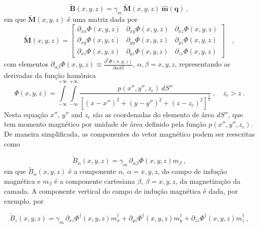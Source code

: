 \begin{equation}
\tilde{\mathbf{B}}(x, y, z) = \gamma_{m} \, \tilde{\mathbf{M}}(x, y, z) \: \hat{\mathbf{m}}(\mathbf{q}) \: ,
\label{eq:B-eqlayer}
\end{equation}
em que $\tilde{\mathbf{M}}(x, y, z)$ é uma matriz dada por 
\begin{equation}
\tilde{\mathbf{M}}(x, y, z) = \begin{bmatrix}
\partial_{xx} \Phi(x, y, z) & 
\partial_{xy} \Phi(x, y, z) &
\partial_{xz} \Phi(x, y, z) \\
\partial_{xy} \Phi(x, y, z) & 
\partial_{yy} \Phi(x, y, z) &
\partial_{yz} \Phi(x, y, z) \\
\partial_{xz} \Phi(x, y, z) & 
\partial_{yz} \Phi(x, y, z) &
\partial_{zz} \Phi(x, y, z)
\end{bmatrix} \quad ,
\label{eq:M-matriz-eqlayer-B}
\end{equation}
com elementos 
$\partial_{\alpha\beta} \Phi(x, y, z) \equiv 
\frac{\partial^{2} \Phi(x, y, z)}{\partial \alpha \partial \beta}$, 
$\alpha, \beta = x, y, z$, representando as derivadas da função hamônica 
\begin{equation}
\Phi(x, y, z) = \int\limits_{-\infty}^{+\infty}\int\limits_{-\infty}^{+\infty}
\frac{p(x'', y'', z_{c}) \: dS''}
{\left[ (x-x'')^2 + (y-y'')^2 + (z-z_{c})^2 \right]^{\frac{1}{2}}} \: ,
\quad z_{c} > z \: .
\label{eq:Phi-integral-superficie-B}
\end{equation}
Nesta equação $x''$, $y''$ and $z_{c}$ são as coordenadas do elemento de área $dS''$, que tem momento magnético por unidade de área definido pela função $p(x'', y'', z_{c})$. De maneira simplificada, as componentes do vetor magnético podem ser reescritas como

\begin{equation}
\tilde{B}_{\alpha}(x, y, z) = \gamma_{m} \, \partial_{\alpha\beta} \Phi(x, y, z) m_{\beta} \: ,
\label{eq:B-eqlayer-notacao-einstein}
\end{equation}
em que $\tilde{B}_{\alpha} (x,y,z)$ é a componente $\alpha$, $\alpha=x,y,z$, do campo de indução magnética e $m_{\beta}$ é a componente cartesiana $\beta$, $\beta =x,y,z$, da magnetização da camada. A componente vertical do campo de indução magnética é dada, por exemplo, por 

\begin{equation}
\tilde{B}_{z}(x, y, z) = \gamma_{m} \, \partial_{xz} \Phi^{\dagger}(x, y, z) m_{x}^{\dagger} + \partial_{yz} \Phi^{\dagger}(x, y, z) m_{y}^{\dagger} + \partial_{zz} \Phi^{\dagger}(x, y, z) m_{z}^{\dagger}   \: ,
\label{eq:Bz-eqlayer}
\end{equation}



